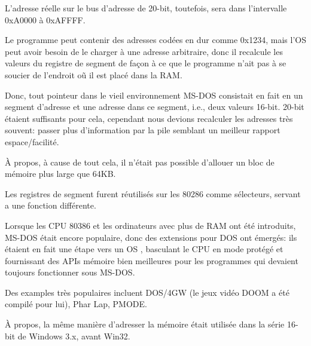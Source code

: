 L'adresse réelle sur le bus d'adresse de 20-bit, toutefois, sera dans l'intervalle
0xA0000 à 0xAFFFF.

Le programme peut contenir des adresses codées en dur comme 0x1234, mais l'\ac{OS}
peut avoir besoin de le charger à une adresse arbitraire, donc il recalcule les valeurs
du registre de segment de façon à ce que le programme n'ait pas à se soucier de
l'endroit oũ il est placé dans la RAM.

Donc, tout pointeur dans le vieil environnement MS-DOS consistait en fait en un segment
d'adresse et une adresse dans ce segment, i.e., deux valeurs 16-bit. 20-bit étaient
suffisants pour cela, cependant nous devions recalculer les adresses très souvent:
passer plus d'information par la pile semblant un meilleur rapport espace/facilité.

À propos, à cause de tout cela, il n'était pas possible d'allouer un bloc de mémoire
plus large que 64KB.


Les registres de segment furent réutilisés sur les 80286 comme sélecteurs, servant
a une fonction différente.


Lorsque les CPU 80386 et les ordinateurs avec plus de \ac{RAM} ont été introduits,
MS-DOS était encore populaire, donc des extensions pour DOS ont émergés: ils étaient
en fait une étape vers un \ac{OS} , basculant le CPU en mode protégé et
fournissant des \ac{API}s mémoire bien meilleures pour les programmes qui devaient
toujours fonctionner sous MS-DOS.

Des examples très populaires incluent DOS/4GW (le jeux vidéo DOOM a été compilé pour
lui), Phar Lap, PMODE.
\par
{}

À propos, la même manière d'adresser la mémoire était utilisée dans la série 16-bit
de Windows 3.x, avant Win32.


